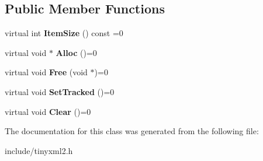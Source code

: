 \subsection*{Public Member Functions}
\begin{DoxyCompactItemize}
\item 
\hypertarget{classtinyxml2_1_1_mem_pool_a0c518d49e3a94bde566f61e13b7240bb}{}virtual int {\bfseries Item\+Size} () const =0\label{classtinyxml2_1_1_mem_pool_a0c518d49e3a94bde566f61e13b7240bb}

\item 
\hypertarget{classtinyxml2_1_1_mem_pool_a4f977b5fed752c0bbfe5295f469d6449}{}virtual void $\ast$ {\bfseries Alloc} ()=0\label{classtinyxml2_1_1_mem_pool_a4f977b5fed752c0bbfe5295f469d6449}

\item 
\hypertarget{classtinyxml2_1_1_mem_pool_a49e3bfac2cba2ebd6776b31e571f64f7}{}virtual void {\bfseries Free} (void $\ast$)=0\label{classtinyxml2_1_1_mem_pool_a49e3bfac2cba2ebd6776b31e571f64f7}

\item 
\hypertarget{classtinyxml2_1_1_mem_pool_ac5804dd1387b2e4de5eef710076a0db1}{}virtual void {\bfseries Set\+Tracked} ()=0\label{classtinyxml2_1_1_mem_pool_ac5804dd1387b2e4de5eef710076a0db1}

\item 
\hypertarget{classtinyxml2_1_1_mem_pool_a74fcdef9756917c8ae19fbbb4d658ed7}{}virtual void {\bfseries Clear} ()=0\label{classtinyxml2_1_1_mem_pool_a74fcdef9756917c8ae19fbbb4d658ed7}

\end{DoxyCompactItemize}


The documentation for this class was generated from the following file\+:\begin{DoxyCompactItemize}
\item 
include/tinyxml2.\+h\end{DoxyCompactItemize}
